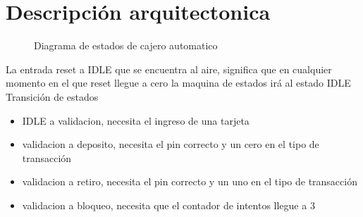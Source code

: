 \section{Descripción arquitectonica}
\begin{figure}[H]\label{fig:ATM}
    \centering
    
    \caption{Diagrama de estados de cajero automatico}
\end{figure}

La entrada reset a IDLE que se encuentra al aire, significa que en cualquier
momento en el que reset llegue a cero la maquina de estados irá al estado IDLE
\\

Transición de estados
\begin{itemize}
    \item IDLE a validacion, necesita el ingreso de una tarjeta
    \item validacion a deposito, necesita el pin correcto y un cero en el tipo
    de transacción
    \item validacion a retiro, necesita el pin correcto y un uno en el tipo
    de transacción
    \item validacion a bloqueo, necesita que el contador de intentos llegue a 3
\end{itemize}

